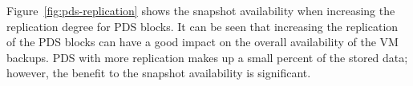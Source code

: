 Figure~\ref{fig:pds-replication}
shows the snapshot availability when increasing the replication degree for PDS blocks. 
It can be seen that increasing the replication of 
the PDS blocks can have a good impact on the overall availability of the VM backups. 
PDS with more replication  makes up a small percent of the
stored data; however, the benefit to the snapshot availability is significant. 

